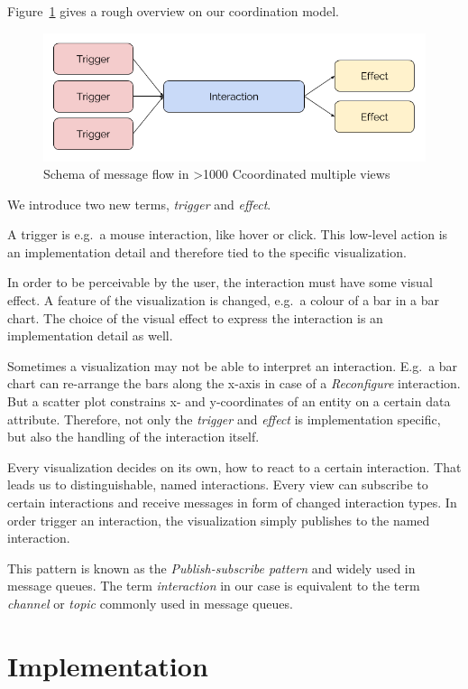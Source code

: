 \documentclass{article}
\newcommand\hmm[1]{\ifnum\ifhmode\spacefactor\else2000\fi>1000 \uppercase{#1}\else#1\fi}
\newcommand{\cmvs}{\hmm{c}oordinated multiple views}
\begin{document}
Figure~\ref{fig:concept:trigger-effect} gives a rough overview on our coordination model.
\begin{figure}[h!]
  \centering
  \includegraphics[width=\textwidth]{images/trigger-effect.png}
  \caption{Schema of message flow in \cmvs{}}\label{fig:concept:trigger-effect}
\end{figure}
We introduce two new terms, \emph{trigger} and \emph{effect}.

A trigger is e.g.\ a mouse interaction, like hover or click.
This low-level action is an implementation detail and therefore tied to the specific visualization.

In order to be perceivable by the user, the interaction must have some visual effect.
A feature of the visualization is changed, e.g.\ a colour of a bar in a bar chart.
The choice of the visual effect to express the interaction is an implementation detail as well.

Sometimes a visualization may not be able to interpret an interaction.
E.g.\ a bar chart can re-arrange the bars along the x-axis in case of a \emph{Reconfigure} interaction.
But a scatter plot constrains x- and y-coordinates of an entity on a certain data attribute.
Therefore, not only the \emph{trigger} and \emph{effect} is implementation specific, but also the handling of the interaction itself.

Every visualization decides on its own, how to react to a certain interaction.
That leads us to distinguishable, named interactions.
Every view can subscribe to certain interactions and receive messages in form of changed interaction types.
In order trigger an interaction, the visualization simply publishes to the named interaction.

This pattern is known as the \emph{Publish-subscribe pattern} and widely used in message queues.
The term \emph{interaction} in our case is equivalent to the term \emph{channel} or \emph{topic} commonly used in message queues.


\clearpage
\section{Implementation}
\end{document}
